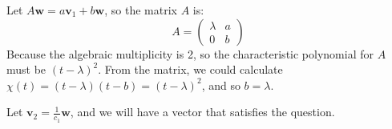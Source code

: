 \documentclass[12pt]{article}
\begin{document}
\begin{itemize}
Let $A\mathbf{w}=a\mathbf{v}_1+b\textbf{w}$, so the matrix $A$ is:
\[
A=\begin{pmatrix}
    \lambda&a\\
    0& b
\end{pmatrix}
\]
Because the algebraic multiplicity is 2, so the characteristic polynomial for $A$ must be $(t-\lambda)^2$. From the matrix, we could calculate $\chi(t)=(t-\lambda)(t-b)=(t-\lambda)^2$, and so $b=\lambda$. 

Let $\mathbf{v}_2=\frac{1}{c_1}\mathbf{w}$, and we will have a vector that satisfies the question. 

\end{itemize}
\end{document}
